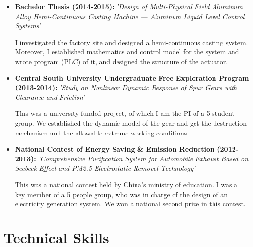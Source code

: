 \documentclass[11pt,a4paper,sans]{moderncv}         %
\begin{document}
\begin{itemize}
    \vspace{6pt}

    \item{\textbf{Bachelor Thesis (2014-2015): }\textit{'Design of Multi-Physical Field Aluminum Alloy Hemi-Continuous Casting Machine — Aluminum Liquid Level Control Systems'}

    \vspace{3pt}

    \small{I investigated the factory site and designed a hemi-continuous casting system. Moreover, I established mathematics and control model for the system and wrote program (PLC) of it, and designed the structure of the actuator.}}

    \vspace{6pt}

    \item{\textbf{Central South University Undergraduate Free Exploration Program (2013-2014): }\textit{'Study on Nonlinear Dynamic Response of Spur Gears with Clearance and Friction'}

    \vspace{3pt}

    \small{This was a university funded project, of which I am the PI of a 5-student group. We established the dynamic model of the gear and get the destruction mechanism and the allowable extreme working conditions.}}

    \vspace{6pt}

    \item{\textbf{National Contest of Energy Saving \& Emission Reduction (2012-2013): }\textit{'Comprehensive Purification System for Automobile Exhaust Based on Seebeck Effect and PM2.5 Electrostatic Removal Technology'}

    \vspace{3pt}

    \small{This was a national contest held by China's ministry of education. I was a key member of a 5 people group, who was in charge of the design of an electricity generation system. We won a national second prize in this contest.}}

    \end{itemize}

    \section{Technical Skills}

    \vspace{3pt}
\end{document}
